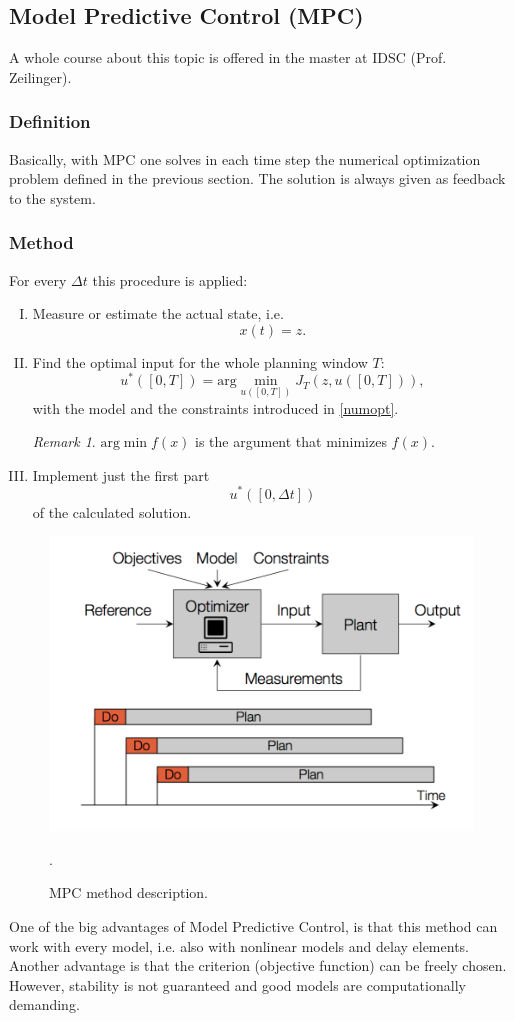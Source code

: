 \documentclass[a4paper,12 pt]{article}
\numberwithin{equation}{section}
\theoremstyle{definition}
\theoremstyle{remark}
\newtheorem*{bmk}{Remark}
\theoremstyle{definition}
\theoremstyle{definition}
\theoremstyle{definition}
\theoremstyle{remark}
\begin{document}
\newpage

\subsection{Model Predictive Control (MPC)}
A whole course about this topic is offered in the master at IDSC (Prof. Zeilinger). 
\subsubsection{Definition}
Basically, with MPC one solves in each time step the numerical optimization problem defined in the previous section. The solution is always given as feedback to the system. 
\subsubsection*{Method}
For every $\Delta t$ this procedure is applied:
\begin{enumerate}[(I)]
\item Measure or estimate the actual state, i.e.
\begin{equation}
x(t)=z.
\end{equation}
\item Find the optimal input for the whole planning window $T$:
\begin{equation}
u^*([0,T])=\text{arg}\min_{u([0,T])}J_T(z,u([0,T])),
\end{equation}
with the model and the constraints introduced in \ref{numopt}.
\begin{bmk}
$\text{arg}\min f(x)$ is the argument that minimizes $f(x)$.
\end{bmk}

\item Implement just the first part 
\begin{equation}
u^*([0,\Delta t])
\end{equation}
of the calculated solution.
\end{enumerate}

\begin{figure}[h]
\centering
\includegraphics[width=0.75\columnwidth]{mpc}
\caption{MPC method description.}
\label{fig:mpc}.
\end{figure}
One of the big advantages of Model Predictive Control, is that this method can work with every model, i.e. also with nonlinear models and delay elements. Another advantage is that the criterion (objective function) can be freely chosen. However, stability is not guaranteed and good models are computationally demanding.
\end{document}
